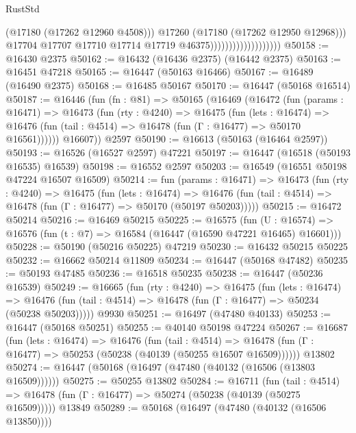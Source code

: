 \begin{lexlean}{RustStd}
\begin{coremodule}
                                              (@17180 (@17262 @12960 @4508)))
                                            @17260
                                            (@17180 (@17262 @12950 @12968)))
                                          @17704
                                          @17707
                                          @17710
                                          @17714
                                          @17719
                                          @46375)))))))))))))))))))
@50158 := @16430 @2375
@50162 := @16432 (@16436 @2375) (@16442 @2375)
@50163 := @16451 @47218
@50165 := @16447 (@50163 @16466)
@50167 := @16489 (@16490 @2375)
@50168 := @16485 @50167
@50170 := @16447 (@50168 @16514)
@50187 := @16446
    (fun (fn : @81) =>
    @50165
      (@16469
        (@16472
          (fun (params : @16471) =>
          @16473
            (fun (rty : @4240) =>
            @16475
              (fun (lets : @16474) =>
              @16476 (fun (tail : @4514) => @16478 (fun (Γ : @16477) => @50170 @16561))))))
        @16607))
    @2597
@50190 := @16613 (@50163 (@16464 @2597))
@50193 := @16526 (@16527 @2597) @47221
@50197 := @16447 (@16518 (@50193 @16535) @16539)
@50198 := @16552 @2597
@50203 := @16549 (@16551 @50198 @47224 @16507 @16509)
@50214 := fun (params : @16471) =>
  @16473
    (fun (rty : @4240) =>
    @16475
      (fun (lets : @16474) =>
      @16476 (fun (tail : @4514) => @16478 (fun (Γ : @16477) => @50170 (@50197 @50203)))))
@50215 := @16472 @50214
@50216 := @16469 @50215
@50225 := @16575
    (fun (U : @16574) => @16576 (fun (t : @7) => @16584 (@16447 (@16590 @47221 @16465) @16601)))
@50228 := @50190 (@50216 @50225) @47219
@50230 := @16432 @50215 @50225
@50232 := @16662 @50214 @11809
@50234 := @16447 (@50168 @47482)
@50235 := @50193 @47485
@50236 := @16518 @50235
@50238 := @16447 (@50236 @16539)
@50249 := @16665
    (fun (rty : @4240) =>
    @16475
      (fun (lets : @16474) =>
      @16476 (fun (tail : @4514) => @16478 (fun (Γ : @16477) => @50234 (@50238 @50203)))))
    @9930
@50251 := @16497 (@47480 @40133)
@50253 := @16447 (@50168 @50251)
@50255 := @40140 @50198 @47224
@50267 := @16687
    (fun (lets : @16474) =>
    @16476
      (fun (tail : @4514) =>
      @16478 (fun (Γ : @16477) => @50253 (@50238 (@40139 (@50255 @16507 @16509))))))
    @13802
@50274 := @16447 (@50168 (@16497 (@47480 (@40132 (@16506 (@13803 @16509))))))
@50275 := @50255 @13802
@50284 := @16711
    (fun (tail : @4514) => @16478 (fun (Γ : @16477) => @50274 (@50238 (@40139 (@50275 @16509)))))
    @13849
@50289 := @50168 (@16497 (@47480 (@40132 (@16506 @13850))))

\end{coremodule}
\end{lexlean}

